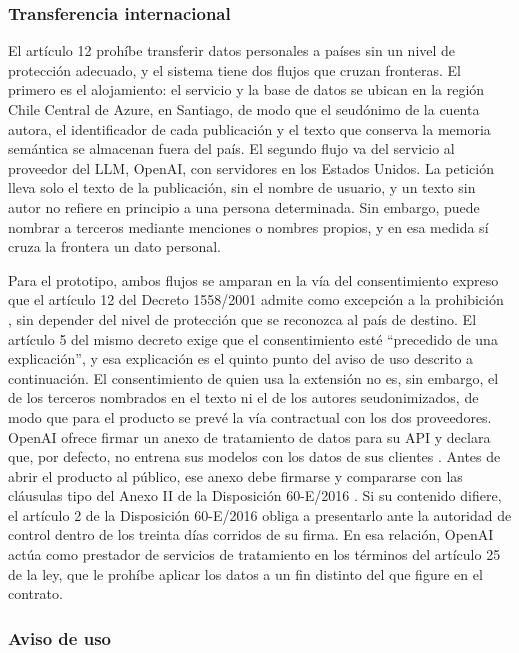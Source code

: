 \subsubsection{Transferencia internacional}

El artículo 12 prohíbe transferir datos personales a países sin un nivel de protección adecuado, y el sistema tiene dos flujos que cruzan fronteras. El primero es el alojamiento: el servicio y la base de datos se ubican en la región Chile Central de Azure, en Santiago, de modo que el seudónimo de la cuenta autora, el identificador de cada publicación y el texto que conserva la memoria semántica se almacenan fuera del país. El segundo flujo va del servicio al proveedor del LLM, OpenAI, con servidores en los Estados Unidos. La petición lleva solo el texto de la publicación, sin el nombre de usuario, y un texto sin autor no refiere en principio a una persona determinada. Sin embargo, puede nombrar a terceros mediante menciones o nombres propios, y en esa medida sí cruza la frontera un dato personal.

Para el prototipo, ambos flujos se amparan en la vía del consentimiento expreso que el artículo 12 del Decreto 1558/2001 admite como excepción a la prohibición \parencite{PoderEjecutivoNacional2001}, sin depender del nivel de protección que se reconozca al país de destino. El artículo 5 del mismo decreto exige que el consentimiento esté \enquote{precedido de una explicación}, y esa explicación es el quinto punto del aviso de uso descrito a continuación. El consentimiento de quien usa la extensión no es, sin embargo, el de los terceros nombrados en el texto ni el de los autores seudonimizados, de modo que para el producto se prevé la vía contractual con los dos proveedores. OpenAI ofrece firmar un anexo de tratamiento de datos para su API y declara que, por defecto, no entrena sus modelos con los datos de sus clientes \parencite{OpenAIPrivacidad2026}. Antes de abrir el producto al público, ese anexo debe firmarse y compararse con las cláusulas tipo del Anexo II de la Disposición 60-E/2016 \parencite{DNPDP2016}. Si su contenido difiere, el artículo 2 de la Disposición 60-E/2016 obliga a presentarlo ante la autoridad de control dentro de los treinta días corridos de su firma. En esa relación, OpenAI actúa como prestador de servicios de tratamiento en los términos del artículo 25 de la ley, que le prohíbe aplicar los datos a un fin distinto del que figure en el contrato.

\subsubsection{Aviso de uso}

